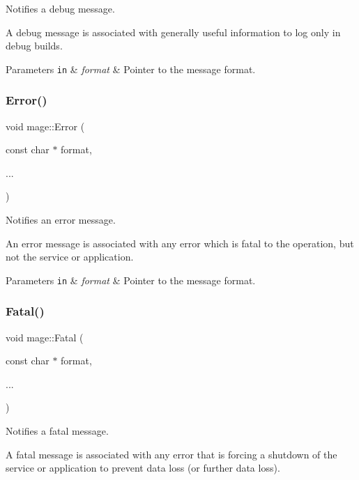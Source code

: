 Notifies a debug message.

A debug message is associated with generally useful information to log only in debug builds.


\begin{DoxyParams}[1]{Parameters}
\mbox{\tt in}  & {\em format} & Pointer to the message format. \\
\hline
\end{DoxyParams}
\hypertarget{namespacemage_a52a7fe8c9ce39afd9e0b0299373db0fa}{}\label{namespacemage_a52a7fe8c9ce39afd9e0b0299373db0fa} 
\subsubsection{\texorpdfstring{Error()}{Error()}}
{\footnotesize\ttfamily void mage\+::\+Error (\begin{DoxyParamCaption}\item[{const char $\ast$}]{format,  }\item[{}]{... }\end{DoxyParamCaption})}

Notifies an error message.

An error message is associated with any error which is fatal to the operation, but not the service or application.


\begin{DoxyParams}[1]{Parameters}
\mbox{\tt in}  & {\em format} & Pointer to the message format. \\
\hline
\end{DoxyParams}
\hypertarget{namespacemage_aefd40c91591a8e0423e4222b4a5e6249}{}\label{namespacemage_aefd40c91591a8e0423e4222b4a5e6249} 
\subsubsection{\texorpdfstring{Fatal()}{Fatal()}}
{\footnotesize\ttfamily void mage\+::\+Fatal (\begin{DoxyParamCaption}\item[{const char $\ast$}]{format,  }\item[{}]{... }\end{DoxyParamCaption})}

Notifies a fatal message.

A fatal message is associated with any error that is forcing a shutdown of the service or application to prevent data loss (or further data loss).


